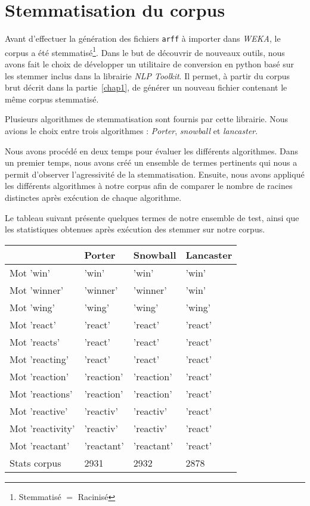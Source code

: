 \section{Stemmatisation du corpus}
Avant d'effectuer la génération des fichiers \texttt{arff} à importer dans \textit{WEKA}, le corpus a été stemmatisé\footnote{Stemmatisé $=$ Racinisé}. Dans le but de découvrir de nouveaux outils, nous avons fait le choix de développer un utilitaire de conversion en python basé sur les stemmer  inclus dans la librairie \textit{NLP Toolkit}. Il permet, à partir du corpus brut décrit dans la partie~\vref{chap1}, de générer un nouveau fichier contenant le même corpus stemmatisé.

Plusieurs algorithmes de stemmatisation sont fournis par cette librairie. Nous avions le choix entre trois algorithmes : \textit{Porter}, \textit{snowball} et \textit{lancaster}.

Nous avons procédé en deux temps pour évaluer les différents algorithmes. Dans un premier temps, nous avons créé un ensemble de termes pertinents qui nous a permit d'observer l'agressivité de la stemmatisation. Ensuite, nous avons appliqué les différents algorithmes à notre corpus afin de comparer le nombre de racines distinctes après exécution de chaque algorithme.

Le tableau suivant présente quelques termes de notre ensemble de test, ainsi que les statistiques obtenues après exécution des stemmer sur notre corpus.

\begin{tabular}{l l l l}
				& \textbf{Porter}	& \textbf{Snowball}	& \textbf{Lancaster} \\
\hline
Mot 'win'		& 'win'				& 'win'				& 'win' \\
Mot 'winner'	& 'winner'			& 'winner'			& 'win' \\
Mot 'wing'		& 'wing'			& 'wing'			& 'wing' \\
\hline
Mot 'react'		& 'react'			& 'react'			& 'react' \\
Mot 'reacts'	& 'react'			& 'react'			& 'react' \\
Mot 'reacting'	& 'react'			& 'react'			& 'react' \\
Mot 'reaction'	& 'reaction'		& 'reaction'		& 'react' \\
Mot 'reactions'	& 'reaction'		& 'reaction'		& 'react' \\
Mot 'reactive'	& 'reactiv'			& 'reactiv'			& 'react' \\
Mot 'reactivity'& 'reactiv'			& 'reactiv'			& 'react' \\
Mot 'reactant'	& 'reactant'		& 'reactant'		& 'react' \\
\hline
\hline
Stats corpus 	& 2931				& 2932 				& 2878 \\
\end{tabular}

